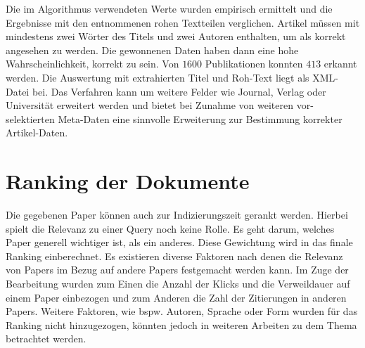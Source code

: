 Die im Algorithmus verwendeten Werte wurden empirisch ermittelt und die Ergebnisse mit
den entnommenen rohen Textteilen verglichen. Artikel
müssen mit mindestens zwei Wörter des Titels und zwei Autoren
enthalten, um als korrekt angesehen zu werden. Die gewonnenen Daten
haben dann eine hohe Wahrscheinlichkeit, korrekt zu sein. Von $1600$
Publikationen konnten $413$ erkannt werden. Die Auswertung mit
extrahierten Titel und Roh-Text liegt als XML-Datei bei. Das
Verfahren kann um weitere Felder wie Journal, Verlag oder Universität
erweitert werden und bietet bei Zunahme von weiteren vor-selektierten
Meta-Daten eine sinnvolle Erweiterung zur Bestimmung korrekter Artikel-Daten.

\section{Ranking der Dokumente}\label{sec:ranking}


Die gegebenen Paper können auch zur Indizierungszeit gerankt
werden. Hierbei spielt die Relevanz zu einer Query noch keine
Rolle. Es geht darum, welches Paper generell wichtiger ist, als ein
anderes. Diese Gewichtung wird in das finale Ranking einberechnet. Es
existieren diverse Faktoren nach denen die Relevanz von Papers im
Bezug auf andere Papers festgemacht werden kann. Im Zuge der
Bearbeitung wurden zum Einen die Anzahl der Klicks und die
Verweildauer auf einem Paper einbezogen und zum Anderen die Zahl der
Zitierungen in anderen Papers. Weitere Faktoren, wie bspw. Autoren,
Sprache oder Form wurden für das Ranking nicht hinzugezogen, könnten
jedoch in weiteren Arbeiten zu dem Thema betrachtet werden.  \\


